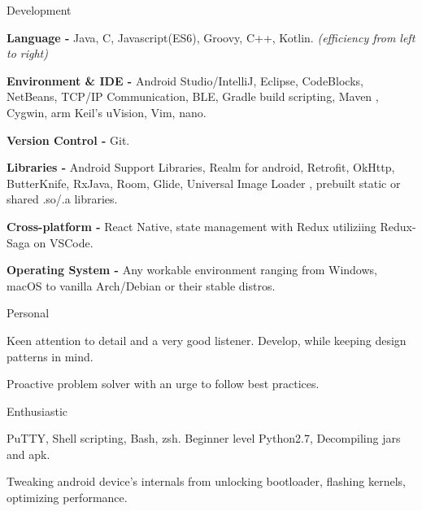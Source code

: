 

\begin{skillsentries}
  
  \skillsentry
    {Development} %
    {
      \begin{skillsitems} %
        \item {\textbf{Language -} Java, C, Javascript(ES6), Groovy, C++, Kotlin. \textsl{(efficiency from left to right)}}
        \item {\textbf{Environment \& IDE -} Android Studio/IntelliJ, Eclipse, CodeBlocks, NetBeans, TCP/IP Communication, BLE, Gradle build scripting, Maven
        , Cygwin, arm Keil's uVision, Vim, nano.}
        \item {\textbf{Version Control -} Git.}
        \item {\textbf{Libraries -} Android Support Libraries, Realm for android, Retrofit, OkHttp, ButterKnife, RxJava, Room, Glide, Universal Image Loader
        , prebuilt static or shared .so/.a libraries.}
        \item {\textbf{Cross-platform -} React Native, state management with Redux utiliziing Redux-Saga on VSCode.}
        \item {\textbf{Operating System - } Any workable environment ranging from Windows, macOS to vanilla Arch/Debian or their stable distros.}
      \end{skillsitems}
    }

    
    \skillsentry
    {Personal} %
    {
      \begin{skillsitems} %
        \item {Keen attention to detail and a very good listener. Develop, while keeping design patterns in mind.}
        \item {Proactive problem solver with an urge to follow best practices.}
      \end{skillsitems}
      }
      
      \skillsentry
      {Enthusiastic} %
      {
        \begin{skillsitems} %
          \item {PuTTY, Shell scripting, Bash, zsh. Beginner level Python2.7, Decompiling jars and apk.}
          \item {Tweaking android device's internals from unlocking bootloader, flashing kernels, optimizing performance.}
        \end{skillsitems}
      }
\end{skillsentries}
